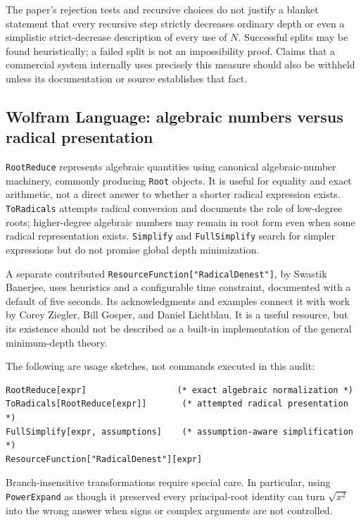 \documentclass[11pt,a4paper]{article}
\theoremstyle{definition}
\theoremstyle{remark}
\numberwithin{equation}{section}
\begin{document}
The paper's rejection tests and recursive choices do not justify a blanket statement that every recursive step strictly decreases ordinary depth or even a simplistic strict-decrease description of every use of $N$. Successful splits may be found heuristically; a failed split is not an impossibility proof. Claims that a commercial system internally uses precisely this measure should also be withheld unless its documentation or source establishes that fact.

\subsection{Wolfram Language: algebraic numbers versus radical presentation}

\texttt{RootReduce} represents algebraic quantities using canonical algebraic-number machinery, commonly producing \texttt{Root} objects. It is useful for equality and exact arithmetic, not a direct answer to whether a shorter radical expression exists. \texttt{ToRadicals} attempts radical conversion and documents the role of low-degree roots; higher-degree algebraic numbers may remain in root form even when some radical representation exists. \texttt{Simplify} and \texttt{FullSimplify} search for simpler expressions but do not promise global depth minimization.\cite{wolframroot,wolframtoradicals}

A separate contributed \texttt{ResourceFunction["RadicalDenest"]}, by Swastik Banerjee, uses heuristics and a configurable time constraint, documented with a default of five seconds. Its acknowledgments and examples connect it with work by Corey Ziegler, Bill Gosper, and Daniel Lichtblau. It is a useful resource, but its existence should not be described as a built-in implementation of the general minimum-depth theory.\cite{wolframresource,wolframcommunity}

The following are usage sketches, not commands executed in this audit:
\begin{lstlisting}
RootReduce[expr]                  (* exact algebraic normalization *)
ToRadicals[RootReduce[expr]]       (* attempted radical presentation *)
FullSimplify[expr, assumptions]    (* assumption-aware simplification *)
ResourceFunction["RadicalDenest"][expr]
\end{lstlisting}
Branch-insensitive transformations require special care. In particular, using \texttt{PowerExpand} as though it preserved every principal-root identity can turn $\sqrt{x^2}$ into the wrong answer when signs or complex arguments are not controlled.
\end{document}
